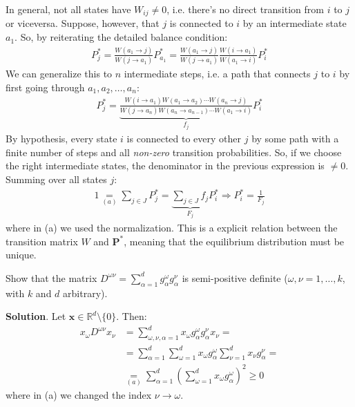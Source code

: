 \documentclass[../template.tex]{subfiles}
\begin{document}
\begin{exo}
\begin{enumerate}
        In general, not all states have $W_{ij} \neq 0$, i.e. there's no direct transition from $i$ to $j$ or viceversa. Suppose, however, that $j$ is connected to $i$ by an intermediate state $a_1$. So, by reiterating the detailed balance condition:
        \begin{align*}
            P_j^* = \frac{W(a_1 \to j )}{W(j \to a_1)} P_{a_1}^* = \frac{W(a_1 \to j )}{W(j \to a_1)} \frac{W(i \to a_1)}{W(a_1 \to i)} P_i^* 
        \end{align*}
        We can generalize this to $n$ intermediate steps, i.e. a path that connects $j$ to $i$ by first going through $a_1, a_2, \dots, a_n$:
        \begin{align*}
            P_j^* = \underbrace{\frac{W(i \to a_1 ) W(a_1 \to a_2 ) \cdots W(a_n \to j)}{W(j \to a_n) W(a_n \to a_{n-1} ) \cdots W(a_1 \to i)}}_{f_j} P_i^*
        \end{align*}
        By hypothesis, every state $i$ is connected to every other $j$ by some path with a finite number of steps and all \textit{non-zero} transition probabilities. So, if we choose the right intermediate states, the denominator in the previous expression is $\neq 0$.
        Summing over all states $j$:
        \begin{align*}
            1 \underset{(a)}{=}  \sum_{j \in J} P_j^* = \underbrace{\sum_{j \in J} f_j}_{F_j}  P_i^* \Rightarrow P_i^* = \frac{1}{F_j} 
        \end{align*}
        where in (a) we used the normalization. This is a explicit relation between the transition matrix $W$ and $\bm{P}^*$, meaning that the equilibrium distribution must be unique.
    \end{enumerate}
\end{exo}

\begin{exo}
    Show that the matrix $D^{\omega \nu} = \sum_{\alpha =1}^d g_\alpha^\omega g^\nu_\alpha$ is semi-positive definite ($\omega, \nu = 1, \dots, k$, with $k$ and $d$ arbitrary).
    
    \medskip

    \textbf{Solution}. Let $\bm{x} \in \mathbb{R}^d \setminus \{0\}$. Then:
    \begin{align*}
        x_\omega D^{\omega \nu} x_\nu &= \sum_{\omega, \nu, \alpha = 1}^d x_{\omega} g_\alpha^\omega g_\alpha^\nu  x_\nu =\\
        &= \sum_{\alpha=1}^d \sum_{\omega = 1}^d x_\omega g_\alpha^\omega \sum_{\nu =1}^d x_\nu g^\nu_{\alpha} =\\
        &\underset{(a)}{=}  \sum_{\alpha = 1}^d \left(\sum_{\omega= 1}^d x_{\omega} g_\alpha^\omega\right)^2 \geq 0 
    \end{align*} 
    where in (a) we changed the index $\nu \to \omega$. 
\end{exo}
\end{document}
